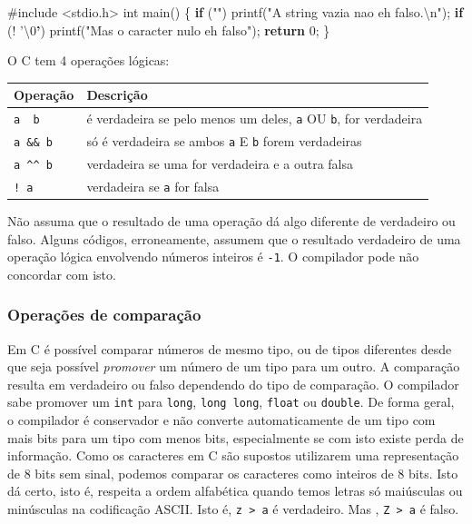 \documentclass[
]{article}
\newenvironment{Shaded}{}{}
\newcommand{\ControlFlowTok}[1]{\textcolor[rgb]{0.00,0.44,0.13}{\textbf{#1}}}
\newcommand{\DataTypeTok}[1]{\textcolor[rgb]{0.56,0.13,0.00}{#1}}
\newcommand{\DecValTok}[1]{\textcolor[rgb]{0.25,0.63,0.44}{#1}}
\newcommand{\ErrorTok}[1]{\textcolor[rgb]{1.00,0.00,0.00}{\textbf{#1}}}
\newcommand{\ImportTok}[1]{#1}
\newcommand{\NormalTok}[1]{#1}
\newcommand{\PreprocessorTok}[1]{\textcolor[rgb]{0.74,0.48,0.00}{#1}}
\newcommand{\SpecialCharTok}[1]{\textcolor[rgb]{0.25,0.44,0.63}{#1}}
\newcommand{\StringTok}[1]{\textcolor[rgb]{0.25,0.44,0.63}{#1}}
\begin{document}
\begin{Shaded}
\begin{Highlighting}[]
\PreprocessorTok{#include }\ImportTok{<stdio.h>}
\DataTypeTok{int}\NormalTok{ main() \{}
  \ControlFlowTok{if}\NormalTok{ (}\StringTok{""}\NormalTok{) printf(}\StringTok{"A string vazia nao eh falso.}\SpecialCharTok{\textbackslash{}n}\StringTok{"}\NormalTok{);}
  \ControlFlowTok{if}\NormalTok{ (! '\textbackslash{}}\DecValTok{0}\ErrorTok{'}\NormalTok{) printf(}\StringTok{"Mas o caracter nulo eh falso"}\NormalTok{);}
  \ControlFlowTok{return} \DecValTok{0}\NormalTok{;}
\NormalTok{\}}
\end{Highlighting}
\end{Shaded}

O C tem 4 operações lógicas:

\begin{longtable}[]{@{}ll@{}}
\toprule
Operação & Descrição\tabularnewline
\midrule
\endhead
\texttt{a\ \textbar{}\textbar{}\ b} & é verdadeira se pelo menos um
deles, \texttt{a} OU \texttt{b}, for verdadeira\tabularnewline
\texttt{a\ \&\&\ b} & só é verdadeira se ambos \texttt{a} E \texttt{b}
forem verdadeiras\tabularnewline
\texttt{a\ \^{}\^{}\ b} & verdadeira se uma for verdadeira e a outra
falsa\tabularnewline
\texttt{!\ a} & verdadeira se \texttt{a} for falsa\tabularnewline
\bottomrule
\end{longtable}

Não assuma que o resultado de uma operação dá algo diferente de
verdadeiro ou falso. Alguns códigos, erroneamente, assumem que o
resultado verdadeiro de uma operação lógica envolvendo números inteiros
é \texttt{-1}. O compilador pode não concordar com isto.

\hypertarget{operauxe7uxf5es-de-comparauxe7uxe3o}{%
\subsubsection{Operações de
comparação}\label{operauxe7uxf5es-de-comparauxe7uxe3o}}

Em C é possível comparar números de mesmo tipo, ou de tipos diferentes
desde que seja possível \emph{promover} um número de um tipo para um
outro. A comparação resulta em verdadeiro ou falso dependendo do tipo de
comparação. O compilador sabe promover um \texttt{int} para
\texttt{long}, \texttt{long\ long}, \texttt{float} ou \texttt{double}.
De forma geral, o compilador é conservador e não converte
automaticamente de um tipo com mais bits para um tipo com menos bits,
especialmente se com isto existe perda de informação. Como os caracteres
em C são supostos utilizarem uma representação de 8 bits sem sinal,
podemos comparar os caracteres como inteiros de 8 bits. Isto dá certo,
isto é, respeita a ordem alfabética quando temos letras só maiúsculas ou
minúsculas na codificação ASCII. Isto é,
\texttt{\textquotesingle{}z\textquotesingle{}\ \textgreater{}\ \textquotesingle{}a\textquotesingle{}}
é verdadeiro. Mas ,
\texttt{\textquotesingle{}Z\textquotesingle{}\ \textgreater{}\ \textquotesingle{}a\textquotesingle{}}
é falso.
\end{document}
